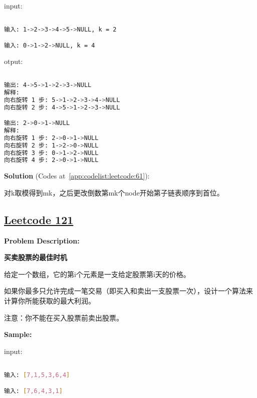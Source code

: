 input:\par

\begin{lstlisting}[language=bash]

输入: 1->2->3->4->5->NULL, k = 2

输入: 0->1->2->NULL, k = 4


\end{lstlisting}

otput:\par

\begin{lstlisting}[language=bash]

输出: 4->5->1->2->3->NULL
解释:
向右旋转 1 步: 5->1->2->3->4->NULL
向右旋转 2 步: 4->5->1->2->3->NULL

输出: 2->0->1->NULL
解释:
向右旋转 1 步: 2->0->1->NULL
向右旋转 2 步: 1->2->0->NULL
向右旋转 3 步: 0->1->2->NULL
向右旋转 4 步: 2->0->1->NULL


\end{lstlisting}

\textbf{Solution }(Codes at~\ref{app:codelist:leetcode:61}):\par

对k取模得到mk，之后更改倒数第mk个node开始第子链表顺序到首位。\par



\subsection{\href{https://leetcode-cn.com/}{Leetcode 121}}\label{app:problemlist:leetcode:121}

\textbf{Problem Description:}\par

\textbf{买卖股票的最佳时机}\par

给定一个数组，它的第i个元素是一支给定股票第i天的价格。\par

如果你最多只允许完成一笔交易（即买入和卖出一支股票一次），设计一个算法来计算你所能获取的最大利润。\par

注意：你不能在买入股票前卖出股票。\par


\textbf{Sample:}\par

input:\par

\begin{lstlisting}[language=bash]

输入: [7,1,5,3,6,4]

输入: [7,6,4,3,1]


\end{lstlisting}

